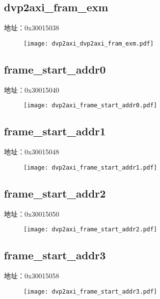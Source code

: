 \subsection{dvp2axi\_fram\_exm}
\label{dvp2axi-dvp2axi-fram-exm}
地址：0x30015038
 \begin{figure}[H]
\texttt{[image: dvp2axi\_dvp2axi\_fram\_exm.pdf]}
\end{figure}

\subsection{frame\_start\_addr0}
\label{dvp2axi-frame-start-addr0}
地址：0x30015040
 \begin{figure}[H]
\texttt{[image: dvp2axi\_frame\_start\_addr0.pdf]}
\end{figure}

\subsection{frame\_start\_addr1}
\label{dvp2axi-frame-start-addr1}
地址：0x30015048
 \begin{figure}[H]
\texttt{[image: dvp2axi\_frame\_start\_addr1.pdf]}
\end{figure}

\subsection{frame\_start\_addr2}
\label{dvp2axi-frame-start-addr2}
地址：0x30015050
 \begin{figure}[H]
\texttt{[image: dvp2axi\_frame\_start\_addr2.pdf]}
\end{figure}

\subsection{frame\_start\_addr3}
\label{dvp2axi-frame-start-addr3}
地址：0x30015058
 \begin{figure}[H]
\texttt{[image: dvp2axi\_frame\_start\_addr3.pdf]}
\end{figure}


